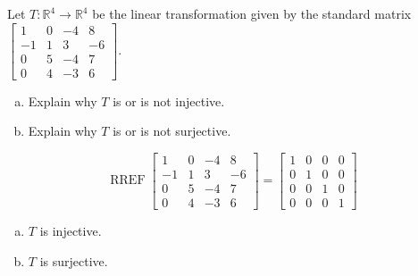 
\begin{exerciseStatement}
 Let \(T:\mathbb{R}^ 4  \to \mathbb{R}^ 4 \) be the linear transformation given by the standard matrix \( \left[\begin{array}{cccc}
1 & 0 & -4 & 8 \\
-1 & 1 & 3 & -6 \\
0 & 5 & -4 & 7 \\
0 & 4 & -3 & 6
\end{array}\right] .\)
\begin{enumerate}[(a)]
\item Explain why \(T\) is or is not injective.
\item Explain why \(T\) is or is not surjective.
\end{enumerate}
    
\end{exerciseStatement}
    
\begin{exerciseAnswer} 


\[\operatorname{RREF} \left[\begin{array}{cccc}
1 & 0 & -4 & 8 \\
-1 & 1 & 3 & -6 \\
0 & 5 & -4 & 7 \\
0 & 4 & -3 & 6
\end{array}\right] = \left[\begin{array}{cccc}
1 & 0 & 0 & 0 \\
0 & 1 & 0 & 0 \\
0 & 0 & 1 & 0 \\
0 & 0 & 0 & 1
\end{array}\right] \]


\begin{enumerate}[(a)]
\item \(T\) is injective.
\item \(T\) is surjective.
\end{enumerate}
    
\end{exerciseAnswer}
    
